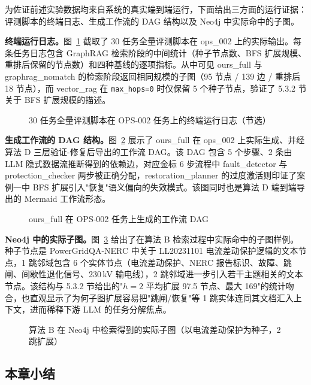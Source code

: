 为佐证前述实验数据均来自系统的真实端到端运行，下面给出三方面的运行证据：评测脚本的终端日志、生成工作流的 DAG 结构以及 Neo4j 中实际命中的子图。

\textbf{终端运行日志。}图~\ref{fig:runtime_log} 截取了 30 任务全量评测脚本在 ops\_002 上的实际输出。每条任务日志包含 GraphRAG 检索阶段的中间统计（种子节点数、BFS 扩展规模、重排后保留的节点数）和四种基线的逐项指标。从中可见 ours\_full 与 graphrag\_nomatch 的检索阶段返回相同规模的子图（95 节点 / 139 边 / 重排后 18 节点），而 vector\_rag 在 \texttt{max\_hops=0} 时仅保留 5 个种子节点，验证了 5.3.2 节关于 BFS 扩展规模的描述。

\begin{figure}[htbp]
\centering

\caption{30 任务全量评测脚本在 OPS-002 任务上的终端运行日志（节选）}
\label{fig:runtime_log}
\end{figure}

\textbf{生成工作流的 DAG 结构。}图~\ref{fig:runtime_workflow} 展示了 ours\_full 在 ops\_002 上实际生成、并经算法 D 三层验证-修复后导出的工作流 DAG。该 DAG 包含 5 个步骤、2 条由 LLM 隐式数据流推断得到的依赖边，对应金标 6 步流程中 fault\_detector 与 protection\_checker 两步被正确分配，restoration\_planner 的过度激活则印证了案例一中 BFS 扩展引入"恢复"语义偏向的失效模式。该图同时也是算法 D 端到端导出的 Mermaid 工作流形态。

\begin{figure}[htbp]
\centering

\caption{ours\_full 在 OPS-002 任务上生成的工作流 DAG}
\label{fig:runtime_workflow}
\end{figure}

\textbf{Neo4j 中的实际子图。}图~\ref{fig:runtime_neo4j} 给出了在算法 B 检索过程中实际命中的子图样例。种子节点是 PowerGridQA-NERC 中关于 LL20231101 电流差动保护逻辑的文本节点，1 跳邻域包含 6 个实体节点（电流差动保护、NERC 报告标识、故障、跳闸、间歇性退化信号、230\,kV 输电线），2 跳邻域进一步引入若干主题相关的文本节点。该结构与 5.3.2 节给出的"$h=2$ 平均扩展 97.5 节点、最大 169"的统计吻合，也直观显示了为何子图扩展容易把"跳闸/恢复"等 1 跳实体连同其文档汇入上下文，进而稀释下游 LLM 的任务分解焦点。

\begin{figure}[htbp]
\centering

\caption{算法 B 在 Neo4j 中检索得到的实际子图（以电流差动保护为种子，2 跳扩展）}
\label{fig:runtime_neo4j}
\end{figure}

\subsection{本章小结}


